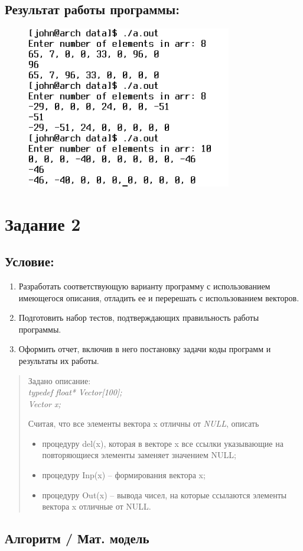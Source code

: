 \documentclass[14pt,a4paper]{article}
\begin{document}
\subsection{Результат работы программы:}
\begin{figure}[H]
  \includegraphics[width=0.8\textwidth]{data/demo18_1.png}
\end{figure}
\section*{Задание 2}
\setcounter{subsection}{0}
\subsection{Условие:}
\begin{enumerate}
  \item Разработать соответствующую варианту программу с использованием
    имеющегося описания, отладить ее и перерешать с использованием векторов.
  \item Подготовить набор тестов, подтверждающих правильность работы программы.
  \item Оформить отчет, включив в него постановку задачи коды программ и
    результаты их работы.
\end{enumerate}
\begin{quote}
  \begin{small}
    Задано описание:\\[1mm]

    \textsl{
      typedef float* Vector[100];\\
      Vector x;
    }

    Считая, что все элементы вектора x отличны от \textsl{NULL}, описать

    \begin{itemize}
      \item процедуру del(x), которая в векторе x все ссылки указывающие на
        повторяющиеся элементы заменяет значением NULL;
      \item процедуру Inp(x) – формирования вектора x;
      \item процедуру Out(x) – вывода чисел, на которые ссылаются элементы
        вектора x отличные от NULL.
    \end{itemize}
  \end{small}
\end{quote}
\subsection{Алгоритм / Мат. модель} 
\end{document}
